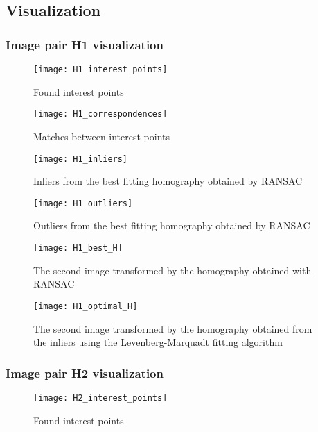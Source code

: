 \subsection{Visualization}

\subsubsection{Image pair H1 visualization}

\begin{figure}[H]
  \centering
  \texttt{[image: H1\_interest\_points]}
  \caption{Found interest points}
\end{figure}

\begin{figure}[H]
  \centering
  \texttt{[image: H1\_correspondences]}
  \caption{Matches between interest points}
\end{figure}

\begin{figure}[H]
  \centering
  \texttt{[image: H1\_inliers]}
  \caption{Inliers from the best fitting homography obtained by RANSAC}
\end{figure}

\begin{figure}[H]
  \centering
  \texttt{[image: H1\_outliers]}
  \caption{Outliers from the best fitting homography obtained by RANSAC}
\end{figure}

\begin{figure}[H]
  \centering
  \texttt{[image: H1\_best\_H]}
  \caption{The second image transformed by the homography obtained with RANSAC}
\end{figure}

\begin{figure}[H]
  \centering
  \texttt{[image: H1\_optimal\_H]}
  \caption{The second image transformed by the homography obtained from the
  inliers using the Levenberg-Marquadt fitting algorithm}
\end{figure}


\subsubsection{Image pair H2 visualization}

\begin{figure}[H]
  \centering
  \texttt{[image: H2\_interest\_points]}
  \caption{Found interest points}
\end{figure}

